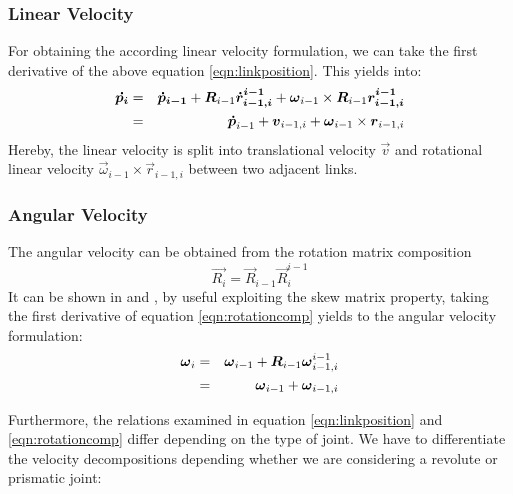 \subsubsection*{Linear Velocity}
For obtaining the according linear velocity formulation, we can take the first derivative of the above equation \ref{eqn:linkposition}. This yields into:
\begin{eqnarray}
\vec{\dot{p_i}} &=& \vec{\dot{p}_{i-1}} + \vec{R}_{i-1}\vec{\dot{r}_{i-1,i}^{i-1}} + \vec{\omega}_{i-1} \times \vec{R}_{i-1}\vec{r_{i-1,i}^{i-1}} \notag \\
&=& \vec{\dot{p}}_{i-1} 
+ \vec{v}_{i-1,i} + 
\vec{\omega}_{i-1} \times \vec{r}_{i-1,i}
\end{eqnarray}
Hereby, the linear velocity is split into translational velocity $\vec{v}$ and rotational linear velocity $\vec{\omega}_{i-1} \times \vec{r}_{i-1,i}$ between two adjacent links.
\subsubsection*{Angular Velocity}
The angular velocity can be obtained from the rotation matrix composition
\begin{equation}
\vec{R_i} = \vec{R}_{i-1}\vec{R}_{i}^{i-1} \label{eqn:rotationcomp}
\end{equation}
It can be shown in \cite{citeulike:1090825} and \cite{opac-b1129198}, by useful exploiting the skew matrix property, taking the first derivative of equation \ref{eqn:rotationcomp} yields to the angular velocity formulation:
\begin{eqnarray}
\vec{\omega}_i &=& \vec{\omega}_{i-1} + \vec{R}_{i-1} \vec{\omega}_{i-1,i}^{i-1} \notag \\
&=& \vec{\omega}_{i-1} + \vec{\omega}_{i-1,i}
\end{eqnarray}

Furthermore, the relations examined in equation \ref{eqn:linkposition} and \ref{eqn:rotationcomp} differ depending on the type of joint. We have to differentiate the velocity decompositions depending whether we are considering a revolute or prismatic joint:

